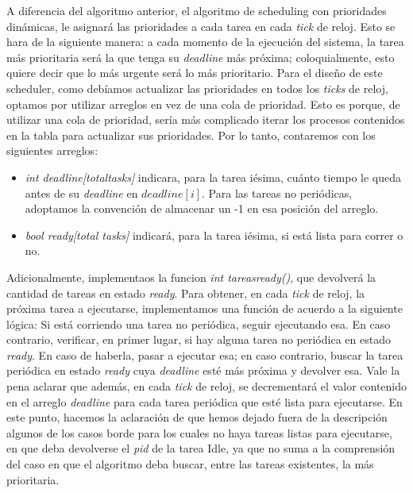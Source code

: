 A diferencia del algoritmo anterior, el algoritmo de scheduling con prioridades din\'amicas, le asignar\'a las prioridades a cada tarea en cada
\textit{tick} de reloj. Esto se hara de la siguiente manera: a cada momento de la ejecuci\'on del sistema, la tarea m\'as prioritaria ser\'a la que
tenga su \textit{deadline} m\'as pr\'oxima; coloquialmente, esto quiere decir que lo m\'as urgente ser\'a lo m\'as prioritario. Para el dise\~no de
este scheduler, como deb\'iamos actualizar las prioridades en todos los \textit{ticks} de reloj, optamos por utilizar arreglos en vez de una cola de 
prioridad. Esto es porque, de utilizar una cola de prioridad, ser\'ia m\'as complicado iterar los procesos contenidos en la tabla para actualizar sus prioridades.
Por lo tanto, contaremos con los siguientes arreglos:

\begin{itemize}
  \item \textit{int deadline[totaltasks]} indicara, para la tarea i\'esima, cu\'anto tiempo le queda antes de su \textit{deadline} en $deadline[i]$. Para las tareas
  no peri\'odicas, adoptamos la convenci\'on de almacenar un -1 en esa posici\'on del arreglo.
  \item \textit{bool ready[total tasks]} indicar\'a, para la tarea i\'esima, si est\'a lista para correr o no.
\end{itemize}

Adicionalmente, implementaos la funcion \textit{int tareasready()}, que devolver\'a la cantidad de tareas en estado \textit{ready}.
Para obtener, en cada \textit{tick} de reloj, la pr\'oxima tarea a ejecutarse, implementamos una funci\'on de acuerdo a la siguiente l\'ogica:
Si est\'a corriendo una tarea no peri\'odica, seguir ejecutando esa. En caso contrario, verificar, en primer lugar, si hay alguna tarea
no peri\'odica en estado \textit{ready}. En caso de haberla, pasar a ejecutar esa; en caso contrario, buscar la tarea peri\'odica en estado
\textit{ready} cuya \textit{deadline} est\'e m\'as pr\'oxima y devolver esa. Vale la pena aclarar
que adem\'as, en cada \textit{tick} de reloj, se decrementar\'a el valor contenido en el arreglo \textit{deadline} para cada tarea peri\'odica que est\'e
lista para ejecutarse. En este punto, hacemos la aclaraci\'on de que hemos dejado fuera de la descripci\'on algunos de los casos borde para los cuales no 
haya tareas listas para ejecutarse, en que deba devolverse el \textit{pid} de la tarea Idle, ya que no suma a la comprensi\'on del caso en que el algoritmo
deba buscar, entre las tareas existentes, la m\'as prioritaria.

